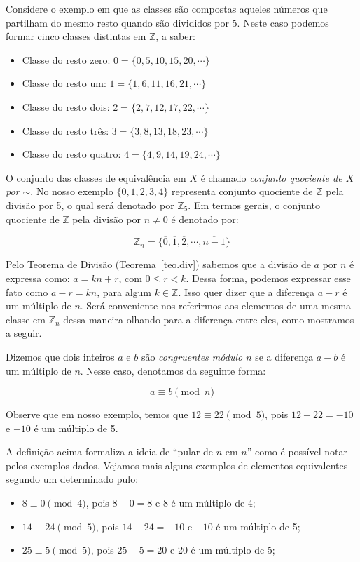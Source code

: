 	Considere o exemplo em que as classes s\~{a}o compostas aqueles n\'{u}meros que partilham do mesmo resto quando s\~{a}o divididos por 
	5. Neste caso podemos formar cinco classes distintas em $\mathbb{Z}$, a saber:
	\begin{itemize}
		\item Classe do resto zero: $\overline{0}=\{0, 5, 10, 15, 20, \cdots\}$
		\item Classe do resto um: $\overline{1}=\{1, 6, 11, 16, 21, \cdots\}$
		\item Classe do resto dois: $\overline{2}=\{2, 7, 12, 17, 22, \cdots\}$
		\item Classe do resto tr\^{e}s: $\overline{3}=\{3, 8, 13, 18, 23, \cdots\}$
		\item Classe do resto quatro: $\overline{4}=\{4, 9, 14, 19, 24, \cdots\}$
	\end{itemize}

	O conjunto das classes de equival\^{e}ncia em $X$ \'{e} chamado \textit{conjunto quociente de $X$ por $\sim$}.
	No nosso exemplo $\{\bar{0}, \bar{1}, \bar{2}, \bar{3}, \bar{4}\}$ representa conjunto quociente 
	de $\mathbb{Z}$ pela divis\~{a}o por 5, o qual ser\'{a} denotado por $\mathbb{Z}_{5}$. Em termos gerais, 
	o conjunto quociente de $\mathbb{Z}$ pela divis\~{a}o por $n\neq 0$ \'{e} denotado por:

	$$\mathbb{Z}_{n}=\{\overline{0}, \overline{1}, \overline{2}, \cdots, \overline{n-1}\}$$ 

Pelo Teorema de Divis\~{a}o (Teorema~\ref{teo.div}) sabemos que a divis\~{a}o de $a$ por $n$ \'{e} expressa como:
$a=kn+r$, com $0\leq r< k$. Dessa forma, podemos expressar esse fato como $a-r=kn$, para algum $k\in\mathbb{Z}$. Isso 
quer dizer que a diferen\c{c}a $a-r$ \'{e} um m\'{u}ltiplo de $n$. Ser\'{a} conveniente nos referirmos aos elementos 
de uma mesma classe em $\mathbb{Z}_{n}$ dessa maneira olhando para a diferen\c{c}a entre eles, como mostramos a seguir. 
   
Dizemos que dois inteiros $a$ e $b$ s\~{a}o \textit{congruentes m\'{o}dulo $n$} se a diferen\c{c}a $a-b$ \'{e} um 
m\'{u}ltiplo de $n$. Nesse caso, denotamos da seguinte forma:

$$a \equiv b \pmod{n}$$ 

Observe que em nosso exemplo, temos que $12 \equiv 22 \pmod{5}$, pois $12-22=-10$ e $-10$ \'{e} um m\'{u}ltiplo de 5. 

A defini\c{c}\~{a}o acima formaliza a ideia de ``pular de $n$ em $n$'' como \'{e} poss\'{i}vel notar 
pelos exemplos dados. Vejamos mais alguns exemplos de elementos equivalentes segundo um determinado pulo:
\begin{itemize}
	\item $8 \equiv 0 \pmod{4}$, pois $8-0=8$ e 8 \'{e} um m\'{u}ltiplo de 4;
	\item $14 \equiv 24  \pmod{5}$, pois $14-24=-10$ e $-10$ \'{e} um m\'{u}ltiplo de 5;
	\item $25 \equiv 5 \pmod{5}$, pois $25-5=20$ e 20 \'{e} um m\'{u}ltiplo de 5;
\end{itemize}

